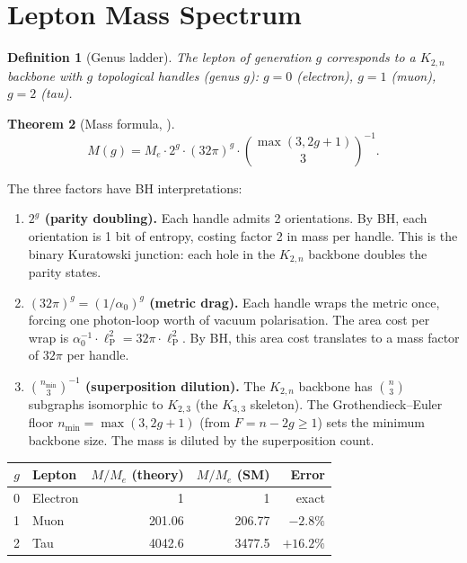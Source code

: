 \documentclass[11pt]{article}
\newtheorem{theorem}{Theorem}[section]
\newtheorem{definition}[theorem]{Definition}
\newcommand{\Kthree}{K_{3,3}}
\newcommand{\Ktwo}[1]{K_{2,#1}}
\newcommand{\lP}{\ell_{\mathrm{P}}}
\begin{document}
\section{Lepton Mass Spectrum}
\label{sec:genus}

\begin{definition}[Genus ladder]
The lepton of generation $g$ corresponds to a $\Ktwo{n}$
backbone with $g$ topological handles (genus $g$):
$g = 0$ (electron), $g = 1$ (muon), $g = 2$ (tau).
\end{definition}

\begin{theorem}[Mass formula, {\cite[writhe.rs]{SilvaAlvarado26}}]
\label{thm:lepton-mass}
\[
  M(g) = M_e \cdot 2^g \cdot (32\pi)^g
  \cdot \binom{\max(3, 2g+1)}{3}^{-1}.
\]
\end{theorem}

The three factors have BH interpretations:

\begin{enumerate}
\item \textbf{$2^g$ (parity doubling).}
  Each handle admits 2 orientations.  By BH, each
  orientation is 1 bit of entropy, costing factor 2 in
  mass per handle.  This is the binary Kuratowski junction:
  each hole in the $\Ktwo{n}$ backbone doubles the parity
  states.

\item \textbf{$(32\pi)^g = (1/\alpha_0)^g$ (metric drag).}
  Each handle wraps the metric once, forcing one photon-loop
  worth of vacuum polarisation.  The area cost per wrap
  is $\alpha_0^{-1} \cdot \lP^2 = 32\pi \cdot \lP^2$.
  By BH, this area cost translates to a mass factor of
  $32\pi$ per handle.

\item \textbf{$\binom{n_{\min}}{3}^{-1}$ (superposition
  dilution).}
  The $\Ktwo{n}$ backbone has $\binom{n}{3}$ subgraphs
  isomorphic to $\Ktwo{3}$ (the $\Kthree$ skeleton).
  The Grothendieck--Euler floor
  $n_{\min} = \max(3, 2g + 1)$ (from $F = n - 2g \ge 1$)
  sets the minimum backbone size.  The mass is diluted by
  the superposition count.
\end{enumerate}

\begin{center}
\renewcommand{\arraystretch}{1.3}
\begin{tabular}{clrrr}
\toprule
$g$ & Lepton & $M/M_e$ (theory) & $M/M_e$ (SM) & Error \\
\midrule
0 & Electron & 1 & 1 & exact \\
1 & Muon & 201.06 & 206.77 & $-2.8\%$ \\
2 & Tau & 4042.6 & 3477.5 & $+16.2\%$ \\
\bottomrule
\end{tabular}
\end{center}
\end{document}

